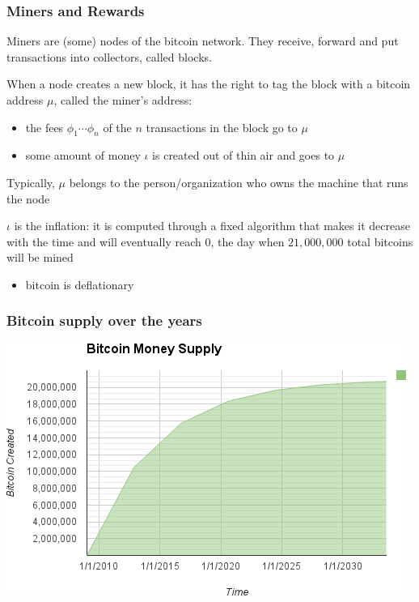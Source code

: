 \documentclass[11pt]{beamer}  %
\begin{document}
\begin{frame}\frametitle{Miners and Rewards}

  Miners are (some) nodes of the bitcoin network. They receive, forward
  and put transactions into collectors, called \alert{blocks}.

  When a node creates a new block, it has the right to tag the block
  with a bitcoin address $\mu$, called the \alert{miner}'s address:

  \begin{itemize}
  \item the fees $\phi_1\cdots\phi_n$ of the $n$ transactions in the block go to $\mu$
  \item some amount of money $\iota$ is created out of thin air and goes to $\mu$
  \end{itemize}

  \medskip
  \begin{greenbox}{}
    Typically, $\mu$ belongs to the person/organization who owns the machine that runs the node
  \end{greenbox}

  \medskip
  \begin{greenbox}{}
    $\iota$ is the \alert{inflation}: it is computed through a fixed algorithm that makes it decrease with the time
    and will eventually reach $0$, the day when $21,000,000$ total bitcoins will be mined
    \begin{itemize}
    \item bitcoin is deflationary
    \end{itemize}
  \end{greenbox}

\end{frame}

\begin{frame}\frametitle{Bitcoin supply over the years}

  \begin{center}
    \includegraphics[width=\textwidth,clip=false]{pictures/mbc2_1001.png}
  \end{center}

\end{frame}
\end{document}
